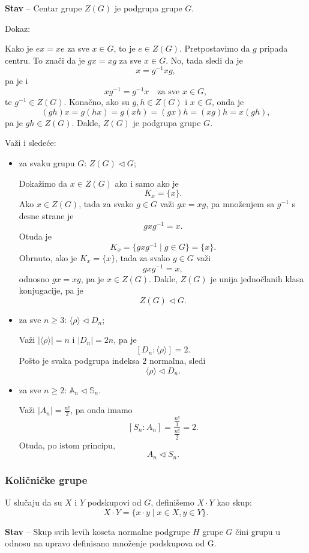 \documentclass[a4paper,12pt]{article}
\newcommand{\f}[1]{\(#1\)}
\begin{document}
\textbf{Stav} -- Centar grupe \f{Z(G)} je podgrupa grupe \f{G}.

Dokaz:

Kako je $ex = xe$ za sve $x \in G$, to je $e \in Z(G)$.
Pretpostavimo da $g$ pripada centru.
To znači da je $gx = xg$ za sve $x \in G$.
No, tada sledi da je
\[
x = g^{-1}xg,
\]
pa je i
\[
xg^{-1} = g^{-1}x \quad \text{za sve } x \in G,
\]
te $g^{-1} \in Z(G)$.
Konačno, ako su $g,h \in Z(G)$ i $x \in G$, onda je
\[
(gh)x = g(hx) = g(xh) = (gx)h = (xg)h = x(gh),
\]
pa je $gh \in Z(G)$.
Dakle, $Z(G)$ je podgrupa grupe $G$.

\medskip

Važi i sledeće:
\begin{itemize}
\item za svaku grupu \f{G}: \f{Z(G) \triangleleft G};

Dokažimo da $x \in Z(G)$ ako i samo ako je
\[
K_x = \{x\}.
\]
Ako $x \in Z(G)$, tada za svako $g \in G$ važi $gx = xg$, pa množenjem sa $g^{-1}$ s desne strane je
\[
gxg^{-1} = x.
\]
Otuda je
\[
K_x = \{gxg^{-1} \mid g \in G\} = \{x\}.
\]
Obrnuto, ako je $K_x = \{x\}$, tada za svako $g \in G$ važi
\[
gxg^{-1} = x,
\]
odnosno $gx = xg$, pa je $x \in Z(G)$.
Dakle, $Z(G)$ je unija jednočlanih klasa konjugacije, pa je
\[
Z(G) \triangleleft G.
\]
\item za sve \f{n \geq 3}: \f{\langle \rho \rangle \triangleleft D_n};

Važi $|\langle \rho \rangle| = n$ i $|D_n| = 2n$, pa je
\[
[D_n : \langle \rho \rangle] = 2.
\]
Pošto je svaka podgrupa indeksa $2$ normalna, sledi
\[
\langle \rho \rangle \triangleleft D_n.
\]

\item za sve \f{n \geq 2}: \f{\mathbb{A}_n \triangleleft \mathbb{S}_n}.

Važi $|A_n| = \frac{n!}{2}$, pa onda imamo
\[
[S_n : A_n] = \frac{\frac{n!}{1}}{\frac{n!}{2}} = 2.
\]
Otuda, po istom principu,
\[
A_n \triangleleft S_n.
\]
\end{itemize}

\subsubsection{Količničke grupe}
U slučaju da su \f{X} i \f{Y} podskupovi od \f{G}, definišemo \f{X \cdot Y} kao skup:
\[
  X \cdot Y = \{ x \cdot y \mid x \in X, y \in Y \}.
\]

\medskip
\textbf{Stav} -- Skup svih levih koseta normalne podgrupe \f{H} grupe \f{G} čini grupu u odnosu na upravo
definisano množenje podskupova od G.
\end{document}
